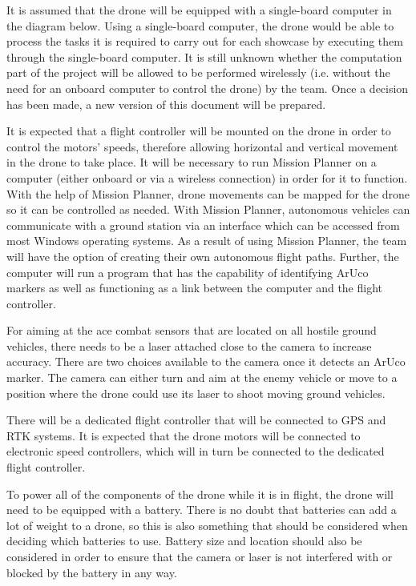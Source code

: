 
It is assumed that the drone will be equipped with a single-board computer in the diagram below. Using a single-board computer, the drone would be able to process the tasks it is required to carry out for each showcase by executing them through the single-board computer. It is still unknown whether the computation part of the project will be allowed to be performed wirelessly (i.e. without the need for an onboard computer to control the drone) by the team. Once a decision has been made, a new version of this document will be prepared.

It is expected that a flight controller will be mounted on the drone in order to control the motors' speeds, therefore allowing horizontal and vertical movement in the drone to take place. It will be necessary to run Mission Planner on a computer (either onboard or via a wireless connection) in order for it to function. With the help of Mission Planner, drone movements can be mapped for the drone so it can be controlled as needed. With Mission Planner, autonomous vehicles can communicate with a ground station via an interface which can be accessed from most Windows operating systems. As a result of using Mission Planner, the team will have the option of creating their own autonomous flight paths. Further, the computer will run a program that has the capability of identifying ArUco markers as well as functioning as a link between the computer and the flight controller.

For aiming at the ace combat sensors that are located on all hostile ground vehicles, there needs to be a laser attached close to the camera to increase accuracy. There are two choices available to the camera once it detects an ArUco marker. The camera can either turn and aim at the enemy vehicle or move to a position where the drone could use its laser to shoot moving ground vehicles.

There will be a dedicated flight controller that will be connected to GPS and RTK systems. It is expected that the drone motors will be connected to electronic speed controllers, which will in turn be connected to the dedicated flight controller.

To power all of the components of the drone while it is in flight, the drone will need to be equipped with a battery. There is no doubt that batteries can add a lot of weight to a drone, so this is also something that should be considered when deciding which batteries to use. Battery size and location should also be considered in order to ensure that the camera or laser is not interfered with or blocked by the battery in any way.

